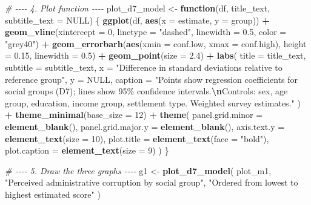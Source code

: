 \documentclass[
]{article}
\newenvironment{Shaded}{\begin{snugshade}}{\end{snugshade}}
\newcommand{\AttributeTok}[1]{\textcolor[rgb]{0.13,0.29,0.53}{#1}}
\newcommand{\CommentTok}[1]{\textcolor[rgb]{0.56,0.35,0.01}{\textit{#1}}}
\newcommand{\ConstantTok}[1]{\textcolor[rgb]{0.56,0.35,0.01}{#1}}
\newcommand{\ControlFlowTok}[1]{\textcolor[rgb]{0.13,0.29,0.53}{\textbf{#1}}}
\newcommand{\DecValTok}[1]{\textcolor[rgb]{0.00,0.00,0.81}{#1}}
\newcommand{\FloatTok}[1]{\textcolor[rgb]{0.00,0.00,0.81}{#1}}
\newcommand{\FunctionTok}[1]{\textcolor[rgb]{0.13,0.29,0.53}{\textbf{#1}}}
\newcommand{\NormalTok}[1]{#1}
\newcommand{\OtherTok}[1]{\textcolor[rgb]{0.56,0.35,0.01}{#1}}
\newcommand{\SpecialCharTok}[1]{\textcolor[rgb]{0.81,0.36,0.00}{\textbf{#1}}}
\newcommand{\StringTok}[1]{\textcolor[rgb]{0.31,0.60,0.02}{#1}}
\begin{document}
\begin{Shaded}
\begin{Highlighting}[]
\CommentTok{\# {-}{-}{-}{-} 4. Plot function {-}{-}{-}{-}}
\NormalTok{plot\_d7\_model }\OtherTok{\textless{}{-}} \ControlFlowTok{function}\NormalTok{(df, title\_text, }\AttributeTok{subtitle\_text =} \ConstantTok{NULL}\NormalTok{) \{}
  \FunctionTok{ggplot}\NormalTok{(df, }\FunctionTok{aes}\NormalTok{(}\AttributeTok{x =}\NormalTok{ estimate, }\AttributeTok{y =}\NormalTok{ group)) }\SpecialCharTok{+}
    \FunctionTok{geom\_vline}\NormalTok{(}\AttributeTok{xintercept =} \DecValTok{0}\NormalTok{, }\AttributeTok{linetype =} \StringTok{"dashed"}\NormalTok{, }\AttributeTok{linewidth =} \FloatTok{0.5}\NormalTok{, }\AttributeTok{color =} \StringTok{"grey40"}\NormalTok{) }\SpecialCharTok{+}
    \FunctionTok{geom\_errorbarh}\NormalTok{(}\FunctionTok{aes}\NormalTok{(}\AttributeTok{xmin =}\NormalTok{ conf.low, }\AttributeTok{xmax =}\NormalTok{ conf.high), }\AttributeTok{height =} \FloatTok{0.15}\NormalTok{, }\AttributeTok{linewidth =} \FloatTok{0.5}\NormalTok{) }\SpecialCharTok{+}
    \FunctionTok{geom\_point}\NormalTok{(}\AttributeTok{size =} \FloatTok{2.4}\NormalTok{) }\SpecialCharTok{+}
    \FunctionTok{labs}\NormalTok{(}
      \AttributeTok{title =}\NormalTok{ title\_text,}
      \AttributeTok{subtitle =}\NormalTok{ subtitle\_text,}
      \AttributeTok{x =} \StringTok{"Difference in standard deviations relative to reference group"}\NormalTok{,}
      \AttributeTok{y =} \ConstantTok{NULL}\NormalTok{,}
      \AttributeTok{caption =} \StringTok{"Points show regression coefficients for social groups (D7); lines show 95\% confidence intervals.}\SpecialCharTok{\textbackslash{}n}\StringTok{Controls: sex, age group, education, income group, settlement type. Weighted survey estimates."}
\NormalTok{    ) }\SpecialCharTok{+}
    \FunctionTok{theme\_minimal}\NormalTok{(}\AttributeTok{base\_size =} \DecValTok{12}\NormalTok{) }\SpecialCharTok{+}
    \FunctionTok{theme}\NormalTok{(}
      \AttributeTok{panel.grid.minor =} \FunctionTok{element\_blank}\NormalTok{(),}
      \AttributeTok{panel.grid.major.y =} \FunctionTok{element\_blank}\NormalTok{(),}
      \AttributeTok{axis.text.y =} \FunctionTok{element\_text}\NormalTok{(}\AttributeTok{size =} \DecValTok{10}\NormalTok{),}
      \AttributeTok{plot.title =} \FunctionTok{element\_text}\NormalTok{(}\AttributeTok{face =} \StringTok{"bold"}\NormalTok{),}
      \AttributeTok{plot.caption =} \FunctionTok{element\_text}\NormalTok{(}\AttributeTok{size =} \DecValTok{9}\NormalTok{)}
\NormalTok{    )}
\NormalTok{\}}

\CommentTok{\# {-}{-}{-}{-} 5. Draw the three graphs {-}{-}{-}{-}}
\NormalTok{g1 }\OtherTok{\textless{}{-}} \FunctionTok{plot\_d7\_model}\NormalTok{(}
\NormalTok{  plot\_m1,}
  \StringTok{"Perceived administrative corruption by social group"}\NormalTok{,}
  \StringTok{"Ordered from lowest to highest estimated score"}
\NormalTok{)}
\end{Highlighting}
\end{Shaded}
\end{document}
